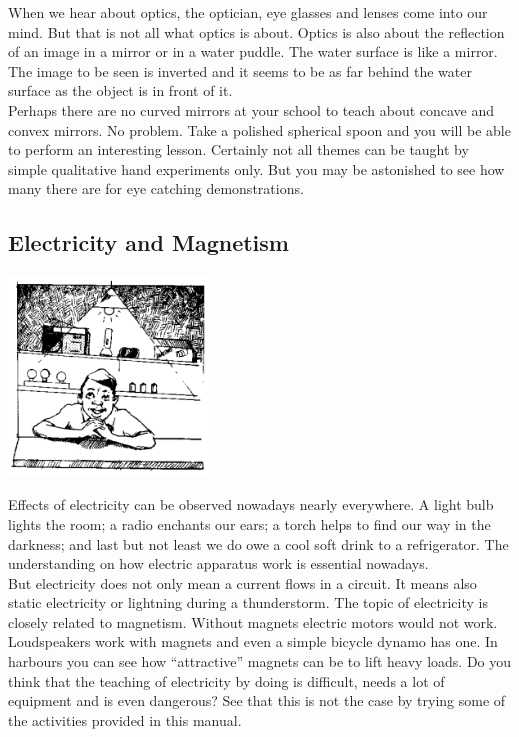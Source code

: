 \begin{multicols}{2}
When we hear about optics, the optician, eye glasses and lenses come into our mind. But that
is not all what optics is about. Optics is also about the reflection of an image in a mirror or in a
water puddle. The water surface is like a mirror. The image to be seen is inverted and it
seems to be as far behind the water surface as the object is in front of it.\\

Perhaps there are no curved mirrors at your school to teach about concave and convex mirrors. No problem. Take a polished spherical spoon and you will be able to perform an interesting lesson. Certainly not all themes can be taught by simple qualitative hand experiments only. But you may be astonished to see how many there are for eye catching demonstrations.

\subsection{Electricity and Magnetism}  

\begin{center}
\includegraphics[width=0.4\textwidth]{./img/source/elec-mag.png}
\end{center}

Effects of electricity can be observed nowadays nearly everywhere. A light bulb lights the
room; a radio enchants our ears; a torch helps to find our way in the darkness; and last but
not least we do owe a cool soft drink to a refrigerator. The understanding on how electric
apparatus work is essential nowadays.\\

But electricity does not only mean a current flows in a circuit. It means also static electricity or lightning during a thunderstorm. The topic of electricity is closely related to magnetism.
Without magnets electric motors would not work. Loudspeakers work with magnets and even
a simple bicycle dynamo has one. In harbours you can see how ``attractive'' magnets can be
to lift heavy loads. Do you think that the teaching of electricity by doing is difficult, needs a lot
of equipment and is even dangerous? See that this is not the case by trying some of the activities provided in this manual.



\end{multicols}

\pagebreak